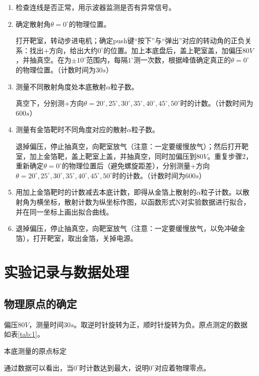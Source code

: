 \documentclass{article}
\begin{document}
\begin{enumerate}
\item
  检查连线是否正常，用示波器监测是否有异常信号。
\item
  确定散射角$\theta=0^\circ$的物理位置。

打开靶室，转动步进电机；确定push键“按下”与“弹出”对应的转动角的正负关系：找出+方向，给出大约$0^{\circ}$的位置。加上本底盘后，盖上靶室盖，加偏压$80\si{V}$，并抽真空。在为$\pm 10^\circ$范围内，每隔$1^\circ$测一次数，根据峰值确定真正的$\theta=0^\circ$的物理位置。（计数时间为$30\si{s}$）

\item
  测量不同散射角度处本底散射$\alpha$粒子数。

真空下，分别测+方向$\theta=20^\circ,25^\circ,30^\circ,35^\circ,40^\circ,45^\circ,50^\circ$时的计数。（计数时间为$600\si{s}$）

\item
  测量有金箔靶时不同角度对应的散射$\alpha$粒子数。

退掉偏压，停止抽真空，向靶室放气（注意：一定要缓慢放气）；然后打开靶室，加上金箔靶，盖上靶室上盖，并抽真空，同时加偏压到$80\si{V}$。重复步骤2，重新确定$\theta=0^\circ$的物理位置后（避免螺旋距差），分别测量+方向$\theta=20^\circ,25^\circ,30^\circ,35^\circ,40^\circ,45^\circ,50^\circ$时的计数。（计数时间为$600\si{s}$）

\item
  用加上金箔靶时的计数减去本底计数，即得从金箔上散射的$\alpha$粒子计数。以散射角为横坐标，散射计数为纵坐标作图，以函数形式N对实验数据进行拟合，并在同一坐标上画出拟合曲线。
\item
  退掉偏压，停止抽真空，向靶室放气（注意：一定要缓慢放气，以免冲破金箔），打开靶室，取出金箔，关掉电源。
\end{enumerate}

\section{实验记录与数据处理}

\subsection{物理原点的确定}

偏压$80\si{V}$，测量时间$30\si{s}$。取逆时针旋转为正，顺时针旋转为负。原点测定的数据如表\ref{tab:1}。
\begin{table}[htbp]
  \centering
  \caption{本底测量的原点标定\label{tab:1}}
  
\end{table}
通过数据可以看出，当$0^\circ$时计数达到最大，说明$0^\circ$对应着物理零点。
\end{document}
